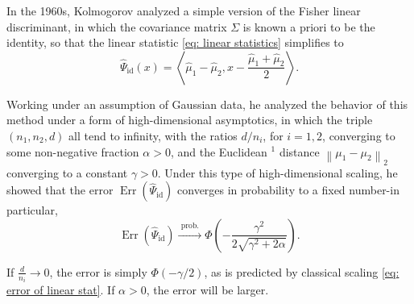 In the 1960s, Kolmogorov analyzed a simple version of the Fisher linear discriminant, in which the covariance matrix $\Sigma$ is known a priori to be the identity, so that the linear statistic \eqref{eq: linear statistics} simplifies to
\begin{equation}
\label{eq: linear stat identity}
\widehat{\Psi}_{\mathrm{id}}(x)=\left\langle\hat{\mu}_1-\hat{\mu}_2, x-\frac{\hat{\mu}_1+\hat{\mu}_2}{2}\right\rangle .    
\end{equation}

Working under an assumption of Gaussian data, he analyzed the behavior of this method under a form of high-dimensional asymptotics, in which the triple $\left(n_1, n_2, d\right)$ all tend to infinity, with the ratios $d / n_i$, for $i=1,2$, converging to some non-negative fraction $\alpha>0$, and the Euclidean ${ }^1$ distance $\left\|\mu_1-\mu_2\right\|_2$ converging to a constant $\gamma>0$. Under this type of high-dimensional scaling, he showed that the error $\operatorname{Err}(\widehat{\Psi}_{\mathrm{id}})$ converges in probability to a fixed number-in particular,
\begin{equation}
\label{eq: err linear stat identity Kolmo}
\operatorname{Err}\left(\widehat{\Psi}_{\mathrm{id}}\right) \stackrel{\text { prob. }}{\longrightarrow} \Phi\left(-\frac{\gamma^2}{2 \sqrt{\gamma^2+2 \alpha}}\right).     
\end{equation}

If $\frac{d}{n_i}\to 0$, the error is simply $\Phi(-\gamma /2)$, as is predicted by classical scaling \eqref{eq: error of linear stat}. If $\alpha >0$, the error will be larger. 